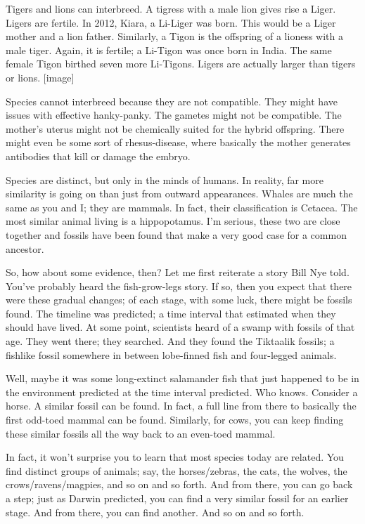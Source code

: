 \begin{multicols}{2}
Tigers and lions can interbreed. A tigress with a male lion gives rise a Liger. Ligers are fertile. In 2012, Kiara, a Li-Liger was born. This would be a Liger mother and a lion father. Similarly, a Tigon is the offspring of a lioness with a male tiger. Again, it is fertile; a Li-Tigon was once born in India. The same female Tigon birthed seven more Li-Tigons. Ligers are actually larger than tigers or lions. [image]

Species cannot interbreed because they are not compatible. They might have issues with effective hanky-panky. The gametes might not be compatible. The mother's uterus might not be chemically suited for the hybrid offspring. There might even be some sort of rhesus-disease, where basically the mother generates antibodies that kill or damage the embryo.

Species are distinct, but only in the minds of humans. In reality, far more similarity is going on than just from outward appearances. Whales are much the same as you and I; they are mammals. In fact, their classification is Cetacea. The most similar animal living is a hippopotamus. I'm serious, these two are close together and fossils have been found that make a very good case for a common ancestor.

So, how about some evidence, then? Let me first reiterate a story Bill Nye told. You've probably heard the fish-grow-legs story. If so, then you expect that there were these gradual changes; of each stage, with some luck, there might be fossils found. The timeline was predicted; a time interval that estimated when they should have lived. At some point, scientists heard of a swamp with fossils of that age. They went there; they searched. And they found the Tiktaalik fossils; a fishlike fossil somewhere in between lobe-finned fish and four-legged animals.

Well, maybe it was some long-extinct salamander fish that just happened to be in the environment predicted at the time interval predicted. Who knows. Consider a horse. A similar fossil can be found. In fact, a full line from there to basically the first odd-toed mammal can be found. Similarly, for cows, you can keep finding these similar fossils all the way back to an even-toed mammal.

In fact, it won't surprise you to learn that most species today are related. You find distinct groups of animals; say, the horses/zebras, the cats, the wolves, the crows/ravens/magpies, and so on and so forth. And from there, you can go back a step; just as Darwin predicted, you can find a very similar fossil for an earlier stage. And from there, you can find another. And so on and so forth.


\end{multicols}
